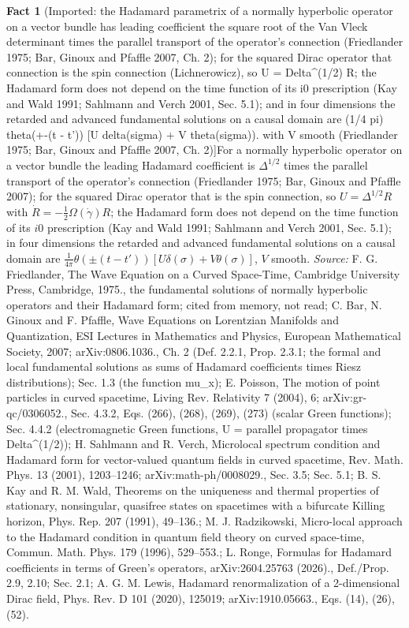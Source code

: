 \documentclass[11pt]{article}
\theoremstyle{definition}
\newtheorem{fact}[theorem]{Fact}
\theoremstyle{plain}
\begin{document}
\begin{fact}[Imported: the Hadamard parametrix of a normally hyperbolic operator on a vector bundle has leading coefficient the square root of the Van Vleck determinant times the parallel transport of the operator's connection (Friedlander 1975; Bar, Ginoux and Pfaffle 2007, Ch. 2); for the squared Dirac operator that connection is the spin connection (Lichnerowicz), so U = Delta\^{}(1/2) R; the Hadamard form does not depend on the time function of its i0 prescription (Kay and Wald 1991; Sahlmann and Verch 2001, Sec. 5.1); and in four dimensions the retarded and advanced fundamental solutions on a causal domain are (1/4 pi) theta(+-(t - t')) [U delta(sigma) + V theta(sigma)] with V smooth (Friedlander 1975; Bar, Ginoux and Pfaffle 2007, Ch. 2)]\label{c:synthesis.imported-hadamard-parametrix-of-the-squared-dirac-operator-leads-with-van-vleck-root-times-spin-transport}
For a normally hyperbolic operator on a vector bundle the leading Hadamard coefficient is $\Delta^{1/2}$ times the parallel transport of the operator's connection (Friedlander 1975; Bar, Ginoux and Pfaffle 2007); for the squared Dirac operator that is the spin connection, so $U = \Delta^{1/2}R$ with $\dot R = -\tfrac12\Omega(\dot\gamma)R$; the Hadamard form does not depend on the time function of its $i0$ prescription (Kay and Wald 1991; Sahlmann and Verch 2001, Sec. 5.1); in four dimensions the retarded and advanced fundamental solutions on a causal domain are $\tfrac{1}{4\pi}\theta(\pm(t - t'))[U\delta(\sigma) + V\theta(\sigma)]$, $V$ smooth.
\emph{Source:} F. G. Friedlander, The Wave Equation on a Curved Space-Time, Cambridge University Press, Cambridge, 1975., the fundamental solutions of normally hyperbolic operators and their Hadamard form; cited from memory, not read; C. Bar, N. Ginoux and F. Pfaffle, Wave Equations on Lorentzian Manifolds and Quantization, ESI Lectures in Mathematics and Physics, European Mathematical Society, 2007; arXiv:0806.1036., Ch. 2 (Def. 2.2.1, Prop. 2.3.1; the formal and local fundamental solutions as sums of Hadamard coefficients times Riesz distributions); Sec. 1.3 (the function mu\_x); E. Poisson, The motion of point particles in curved spacetime, Living Rev. Relativity 7 (2004), 6; arXiv:gr-qc/0306052., Sec. 4.3.2, Eqs. (266), (268), (269), (273) (scalar Green functions); Sec. 4.4.2 (electromagnetic Green functions, U = parallel propagator times Delta\^{}(1/2)); H. Sahlmann and R. Verch, Microlocal spectrum condition and Hadamard form for vector-valued quantum fields in curved spacetime, Rev. Math. Phys. 13 (2001), 1203--1246; arXiv:math-ph/0008029., Sec. 3.5; Sec. 5.1; B. S. Kay and R. M. Wald, Theorems on the uniqueness and thermal properties of stationary, nonsingular, quasifree states on spacetimes with a bifurcate Killing horizon, Phys. Rep. 207 (1991), 49--136.; M. J. Radzikowski, Micro-local approach to the Hadamard condition in quantum field theory on curved space-time, Commun. Math. Phys. 179 (1996), 529--553.; L. Ronge, Formulas for Hadamard coefficients in terms of Green's operators, arXiv:2604.25763 (2026)., Def./Prop. 2.9, 2.10; Sec. 2.1; A. G. M. Lewis, Hadamard renormalization of a 2-dimensional Dirac field, Phys. Rev. D 101 (2020), 125019; arXiv:1910.05663., Eqs. (14), (26), (52).
\end{fact}
\end{document}
